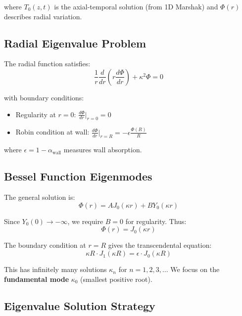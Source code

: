 \documentclass[12pt,a4paper]{article}
\begin{document}
where $T_0(z,t)$ is the axial-temporal solution (from 1D Marshak) and $\Phi(r)$ describes radial variation.

\subsection{Radial Eigenvalue Problem}

The radial function satisfies:
\begin{equation}
\frac{1}{r}\frac{d}{dr}\left(r\frac{d\Phi}{dr}\right) + \kappa^2 \Phi = 0
\end{equation}

with boundary conditions:
\begin{itemize}
    \item Regularity at $r=0$: $\frac{d\Phi}{dr}\big|_{r=0} = 0$
    \item Robin condition at wall: $\frac{d\Phi}{dr}\big|_{r=R} = -\epsilon \frac{\Phi(R)}{R}$
\end{itemize}

where $\epsilon = 1 - \alpha_{\text{wall}}$ measures wall absorption.

\subsection{Bessel Function Eigenmodes}

The general solution is:
\begin{equation}
\Phi(r) = A J_0(\kappa r) + B Y_0(\kappa r)
\end{equation}

Since $Y_0(0) \to -\infty$, we require $B=0$ for regularity. Thus:
\begin{equation}
\Phi(r) = J_0(\kappa r)
\end{equation}

The boundary condition at $r=R$ gives the transcendental equation:
\begin{equation}
\boxed{\kappa R \cdot J_1(\kappa R) = \epsilon \cdot J_0(\kappa R)}
\end{equation}

This has infinitely many solutions $\kappa_n$ for $n=1,2,3,\ldots$ We focus on the \textbf{fundamental mode} $\kappa_0$ (smallest positive root).

\subsection{Eigenvalue Solution Strategy}
\end{document}
